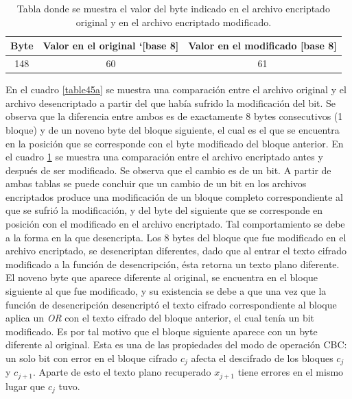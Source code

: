 \documentclass[a4paper,10pt]{article}
\begin{document}
\begin{table}
\begin{center}
\begin{tabular}{|c|c|c|}
\hline
Byte & Valor en el original `[base 8] & Valor en el modificado [base 8]\\
\hline
\hline
148 & 60 & 61\\
\hline
\end{tabular}
\end{center}
\caption{Tabla donde se muestra el valor del byte indicado en el archivo encriptado original y en el archivo encriptado modificado.}
\label{table45b}
\end{table}
En el cuadro \ref{table45a} se muestra una comparaci\'on entre el archivo original y el archivo desencriptado a partir del que hab\'ia sufrido 
la modificaci\'on del bit. Se observa que la diferencia entre ambos es de exactamente 8 bytes consecutivos (1 bloque) y de un noveno byte del 
bloque siguiente, el cual es el que se encuentra en la posici\'on que se corresponde con el byte modificado del bloque anterior.
En el cuadro \ref{table45b} se muestra una comparaci\'on entre el archivo encriptado antes y despu\'es de ser modificado. Se observa que
el cambio es de un bit.
A partir de ambas tablas se puede concluir que un cambio de un bit en los archivos encriptados produce una modificaci\'on de un bloque completo
correspondiente al que se sufri\'o la modificaci\'on, y del byte del siguiente que se corresponde en posici\'on con el modificado en el archivo 
encriptado.
Tal comportamiento se debe a la forma en la que desencripta. Los 8 bytes del bloque que fue modificado en el archivo encriptado, se desencriptan
diferentes, dado que al entrar el texto cifrado modificado a la funci\'on de desencripci\'on, \'esta retorna un texto plano diferente. El noveno
byte que aparece diferente al original, se encuentra en el bloque siguiente al que fue modificado, y su existencia se debe a que una vez que la 
funci\'on de desencripci\'on desencript\'o el texto cifrado correspondiente al bloque aplica un \emph{OR} con el texto cifrado del bloque anterior, 
el cual ten\'ia un bit modificado. Es por tal motivo que el bloque siguiente aparece con un byte diferente al original.
Esta es una de las propiedades del modo de operaci\'on CBC: un solo bit con error en el bloque cifrado $ c_{j} $ afecta
el descifrado de los bloques $ c_{j} $ y $ c_{j +1} $. Aparte de esto el texto plano recuperado $ x_{j + 1} $ tiene
errores en el mismo lugar que $ c_{j} $ tuvo. 
\end{document}

